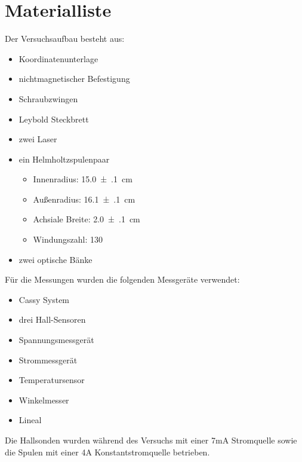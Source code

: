 \documentclass[12pt,a4paper]{article}
\begin{document}
\section{Materialliste}
Der Versuchsaufbau besteht aus:
\begin{itemize}
	\item Koordinatenunterlage
	\item nichtmagnetischer Befestigung
	\item Schraubzwingen
	\item Leybold Steckbrett
	\item zwei Laser
	\item ein Helmholtzspulenpaar
	\begin{itemize}
		\item Innenradius: \SI{15.0(1)}{\centi m}
		\item Außenradius: \SI{16.1(1)}{\centi m}
		\item Achsiale Breite: \SI{2.0(1)}{\centi m}
		\item Windungszahl: \SI{130}{}
	\end{itemize}
	\item zwei optische Bänke
\end{itemize}
Für die Messungen wurden die folgenden Messgeräte verwendet:
\begin{itemize}
\item Cassy System
\item drei Hall-Sensoren
\item Spannungsmessgerät
\item Strommessgerät
\item Temperatursensor
\item Winkelmesser
\item Lineal
\end{itemize}
Die Hallsonden wurden während des Versuchs mit einer 7mA Stromquelle 
sowie die Spulen mit einer 4A Konstantstromquelle betrieben.
\end{document}
